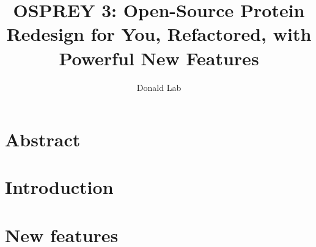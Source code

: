 \documentclass[11pt, oneside]{article}   	%
\title{OSPREY 3: Open-Source Protein Redesign for You, Refactored, with Powerful New Features}
\author{Donald Lab}
\begin{document}
\maketitle

\section{Abstract}

\section{Introduction}


\section{New features}



\end{document}
